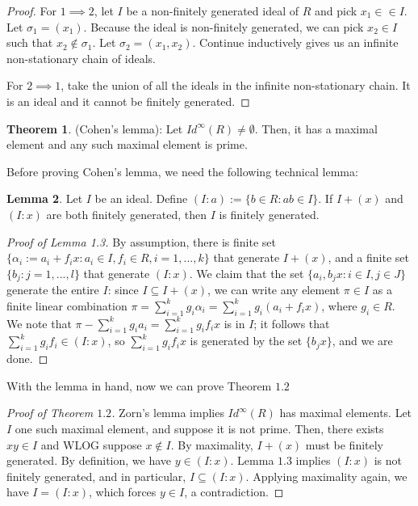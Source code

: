 \documentclass{article}
\theoremstyle{definition}
\newtheorem{theorem}{Theorem}[section]
\theoremstyle{definition}
\theoremstyle{definition}
\theoremstyle{definition}
\newtheorem{lemma}[theorem]{Lemma}
\theoremstyle{definition}
\theoremstyle{definition}
\theoremstyle{definition}
\begin{document}
\begin{proof}
    For $1\implies 2$, let $I$ be a non-finitely generated ideal of $R$ and pick $x_1\in \in I$. Let $\sigma_1=(x_1)$. Because the ideal is non-finitely generated, we can pick $x_2\in I$ such that $x_2\not \in \sigma_1$. Let $\sigma_2=(x_1,x_2)$. Continue inductively gives us an infinite non-stationary chain of ideals. 

    For $2\implies 1$, take the union of all the ideals in the infinite non-stationary chain. It is an ideal and it cannot be finitely generated. 
\end{proof}


\begin{tcolorbox}[colback=red!5!white,colframe=red!30!white]
\begin{theorem}
    (Cohen's lemma): Let $Id^{\infty}(R)\neq \emptyset$. Then, it has a maximal element and any such maximal element is prime. 
\end{theorem}
\end{tcolorbox}
Before proving Cohen's lemma, we need the following technical lemma:\

\begin{tcolorbox}
\begin{lemma}
    Let $I$ be an ideal. Define $(I:a):=\{ b\in R: ab\in I \}$. If $I+(x)$ and $(I:x)$ are both finitely generated, then $I$ is finitely generated.
\end{lemma}
\end{tcolorbox}
\begin{proof}[Proof of Lemma 1.3]
    By assumption, there is finite set $\{ \alpha_i:=a_i+f_ix: a_i\in I, f_i\in R, i=1,...,k \}$ that generate $I+(x)$, and a finite set $\{ b_j: j=1,...,l \}$ that generate $(I:x)$. We claim that the set $\{ a_i, b_jx: i\in I, j\in J\}$ generate the entire $I$: since $I\subseteq I+(x)$, we can write any element $\pi\in I$ as a finite linear combination $\pi=\sum_{i=1}^{k}g_i\alpha_i=\sum_{i=1}^{k}g_i(a_i+f_ix)$, where $g_i\in R$. We note that $\pi-\sum_{i=1}^{k}g_ia_i=\sum_{i=1}^{k}g_if_ix$ is in $I$; it follows that $\sum_{i=1}^{k}g_if_i\in (I:x)$, so $\sum_{i=1}^{k}g_if_ix$ is generated by the set $ \{b_jx\}$, and we are done. 
\end{proof}

With the lemma in hand, now we can prove Theorem $1.2$
\begin{proof}[Proof of Theorem $1.2$]
    Zorn's lemma implies $Id^{\infty}(R)$ has maximal elements.  Let $I$ one such maximal element, and suppose it is not prime. Then, there exists $xy\in I$ and WLOG suppose $x\not \in I$. By maximality, $I+(x)$ must be finitely generated. By definition, we have $y\in (I:x)$. Lemma $1.3$ implies $(I:x)$ is not finitely generated, and in particular, $I\subseteq (I:x)$. Applying maximality again, we have $I=(I:x)$, which forces $y\in I$, a contradiction.
\end{proof}
\end{document}
